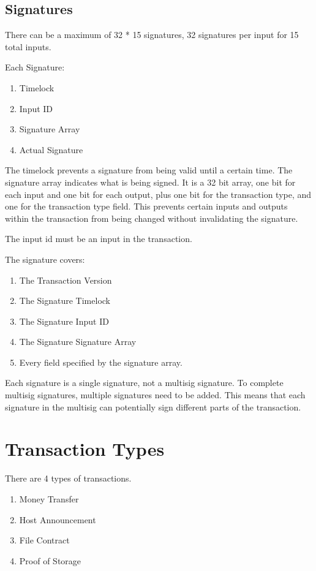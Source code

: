 \documentclass[twocolumn]{article}
\begin{document}
\subsection{Signatures}
There can be a maximum of 32 * 15 signatures, 32 signatures per input for 15 total inputs.

Each Signature:
\begin{enumerate}
	\item Timelock
	\item Input ID
	\item Signature Array
	\item Actual Signature
\end{enumerate}

The timelock prevents a signature from being valid until a certain time.
The signature array indicates what is being signed.
It is a 32 bit array, one bit for each input and one bit for each output, plus one bit for the transaction type, and one for the transaction type field.
This prevents certain inputs and outputs within the transaction from being changed without invalidating the signature.

The input id must be an input in the transaction.

The signature covers:
\begin{enumerate}
	\item The Transaction Version
	\item The Signature Timelock
	\item The Signature Input ID
	\item The Signature Signature Array
	\item Every field specified by the signature array.
\end{enumerate}

Each signature is a single signature, not a multisig signature.
To complete multisig signatures, multiple signatures need to be added.
This means that each signature in the multisig can potentially sign different parts of the transaction.

\section{Transaction Types}
There are 4 types of transactions.
\begin{enumerate}
	\item Money Transfer
	\item Host Announcement
	\item File Contract
	\item Proof of Storage
\end{enumerate}
\end{document}
